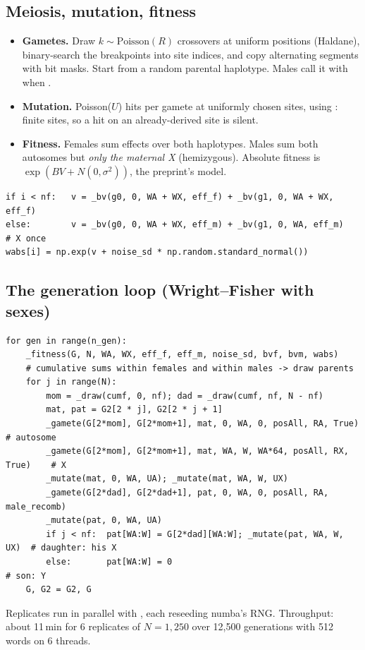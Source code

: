 \subsection{Meiosis, mutation, fitness}
\begin{itemize}
\item \textbf{Gametes.} Draw $k\sim\mathrm{Poisson}(R)$ crossovers at uniform positions (Haldane), binary-search the breakpoints into site indices, and copy alternating segments with bit masks. Start from a random parental haplotype. Males call it with  when .
\item \textbf{Mutation.} Poisson($U$) hits per gamete at uniformly chosen sites, using \code{|=}: finite sites, so a hit on an already-derived site is silent.
\item \textbf{Fitness.} Females sum effects over both haplotypes. Males sum both autosomes but \emph{only the maternal X} (hemizygous). Absolute fitness is $\exp(BV+N(0,\sigma^2))$, the preprint's model.
\end{itemize}
\begin{lstlisting}
if i < nf:   v = _bv(g0, 0, WA + WX, eff_f) + _bv(g1, 0, WA + WX, eff_f)
else:        v = _bv(g0, 0, WA + WX, eff_m) + _bv(g1, 0, WA, eff_m)   # X once
wabs[i] = np.exp(v + noise_sd * np.random.standard_normal())
\end{lstlisting}

\subsection{The generation loop (Wright--Fisher with sexes)}
\begin{lstlisting}
for gen in range(n_gen):
    _fitness(G, N, WA, WX, eff_f, eff_m, noise_sd, bvf, bvm, wabs)
    # cumulative sums within females and within males -> draw parents
    for j in range(N):
        mom = _draw(cumf, 0, nf); dad = _draw(cumf, nf, N - nf)
        mat, pat = G2[2 * j], G2[2 * j + 1]
        _gamete(G[2*mom], G[2*mom+1], mat, 0, WA, 0, posAll, RA, True)        # autosome
        _gamete(G[2*mom], G[2*mom+1], mat, WA, W, WA*64, posAll, RX, True)    # X
        _mutate(mat, 0, WA, UA); _mutate(mat, WA, W, UX)
        _gamete(G[2*dad], G[2*dad+1], pat, 0, WA, 0, posAll, RA, male_recomb)
        _mutate(pat, 0, WA, UA)
        if j < nf:  pat[WA:W] = G[2*dad][WA:W]; _mutate(pat, WA, W, UX)  # daughter: his X
        else:       pat[WA:W] = 0                                        # son: Y
    G, G2 = G2, G
\end{lstlisting}
Replicates run in parallel with , each reseeding numba's RNG. Throughput: about 11\,min for 6 replicates of $N=1{,}250$ over 12,500 generations with 512 words on 6 threads.

